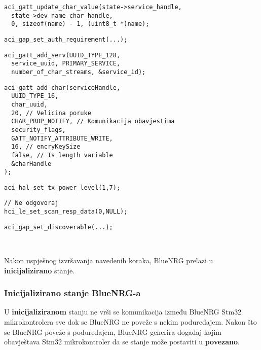 \documentclass[times, utf8, diplomski]{diplomski}
\begin{document}
\begin{lstlisting}[caption={Postavi ime kojim će se predstavljati ostalim bluetooth uređajima.}]
aci_gatt_update_char_value(state->service_handle,
  state->dev_name_char_handle,
  0, sizeof(name) - 1, (uint8_t *)name);
\end{lstlisting}

\begin{lstlisting}[caption={Postavi autentifikacijske zahtjeve}]
aci_gap_set_auth_requirement(...);
\end{lstlisting}

\begin{lstlisting}[caption={Postavljanje sevisa koji sadrži karakteristične tokve}]
aci_gatt_add_serv(UUID_TYPE_128,
  service_uuid, PRIMARY_SERVICE,
  number_of_char_streams, &service_id);
\end{lstlisting}

\begin{lstlisting}[caption={Postavljanje karakterističnih tokova}]
aci_gatt_add_char(serviceHandle,
  UUID_TYPE_16,
  char_uuid,
  20, // Velicina poruke
  CHAR_PROP_NOTIFY, // Komunikacija obavjestima
  security_flags,
  GATT_NOTIFY_ATTRIBUTE_WRITE,
  16, // encryKeySize
  false, // Is length variable
  &charHandle
);
\end{lstlisting}

\begin{lstlisting}[caption={Postavi snagu odašiljača}]
aci_hal_set_tx_power_level(1,7);
\end{lstlisting}

\begin{lstlisting}[caption={Postavi odgovor na poruku otkrivanja (engl. discover message)}]
// Ne odgovoraj
hci_le_set_scan_resp_data(0,NULL);
\end{lstlisting}

\begin{lstlisting}[caption={Postavi stanje BlueNRGa u stanje u povezivo stanje}, label={lastinit}]
aci_gap_set_discoverable(...);
\end{lstlisting}
\ \

Nakon uspješnog izvršavanja navedenih koraka, BlueNRG prelazi u \textbf{inicijalizirano} stanje.

\subsubsection{Inicijalizirano stanje BlueNRG-a}
U \textbf{inicijaliziranom} stanju ne vrši se komunikacija između BlueNRG Stm32 mikrokontrolera sve dok se BlueNRG ne poveže s nekim poduređajem. Nakon što se BlueNRG poveže s poduređajem, BlueNRG generira događaj kojim obavještava Stm32 mikrokontroler da se stanje može postaviti u \textbf{povezano}.
\end{document}
